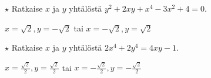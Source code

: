 \begin{tehtavasivu}
\begin{tehtava}
    $\star$ Ratkaise $x$ ja $y$ yhtälöstä $y^2+2xy+x^4-3x^2+4=0$.
    \begin{vastaus}
        $x=\sqrt{2}, y=-\sqrt{2}$ tai $x=-\sqrt{2}, y=\sqrt{2}$
    \end{vastaus}
\end{tehtava}

\begin{tehtava} %
    $\star$ Ratkaise $x$ ja $y$ yhtälöstä $2x^4+2y^4=4xy-1$. %
    \begin{vastaus}
        $x=\frac{\sqrt{2}}{2}, y=\frac{\sqrt{2}}{2}$ tai $x=-\frac{\sqrt{2}}{2}, y=-\frac{\sqrt{2}}{2}$
    \end{vastaus}
\end{tehtava}

\end{tehtavasivu}
